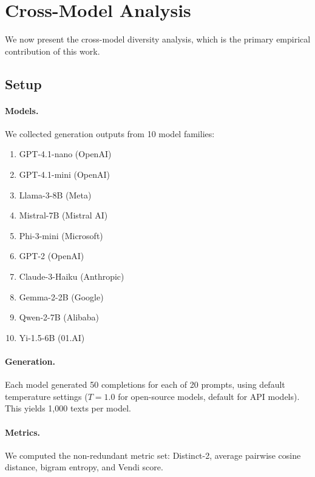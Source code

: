 \documentclass[11pt,a4paper]{article}
\begin{document}
\section{Cross-Model Analysis}\label{sec:crossmodel}

We now present the cross-model diversity analysis, which
is the primary empirical contribution of this work.

\subsection{Setup}

\paragraph{Models.}
We collected generation outputs from 10 model families:
\begin{enumerate}[leftmargin=2em,itemsep=1pt]
\item GPT-4.1-nano (OpenAI)
\item GPT-4.1-mini (OpenAI)
\item Llama-3-8B (Meta)
\item Mistral-7B (Mistral AI)
\item Phi-3-mini (Microsoft)
\item GPT-2 (OpenAI)
\item Claude-3-Haiku (Anthropic)
\item Gemma-2-2B (Google)
\item Qwen-2-7B (Alibaba)
\item Yi-1.5-6B (01.AI)
\end{enumerate}

\paragraph{Generation.}
Each model generated 50 completions for each of 20
prompts, using default temperature settings ($T = 1.0$
for open-source models, default for API models).
This yields 1{,}000 texts per model.

\paragraph{Metrics.}
We computed the non-redundant metric set:
Distinct-2, average pairwise cosine distance, bigram
entropy, and Vendi score.
\end{document}
